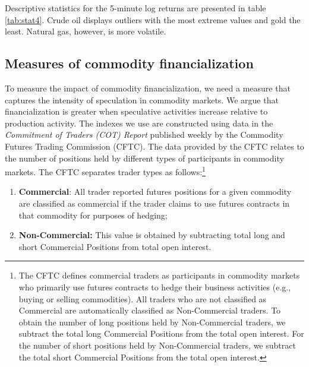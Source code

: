 \documentclass[12pt]{article}
\begin{document}
Descriptive statistics for the 5-minute log returns are presented in table \ref{tab:stat4}. Crude oil displays  outliers with the most extreme values and gold the least. Natural gas, however, is more volatile. %


\subsection{Measures of commodity financialization}
To measure the impact of commodity financialization, we need a measure that captures the intensity of speculation in commodity markets. We argue that financialization is greater when speculative activities increase relative to production activity. The indexes we use are constructed using data in the \emph{Commitment of Traders (COT) Report} published weekly by the Commodity Futures Trading Commission (CFTC).  The data provided by the CFTC relates to the number of positions held by different types of participants in commodity markets. The CFTC separates trader types as follows:\footnote{The CFTC defines commercial traders as participants in commodity markets who primarily use futures contracts to hedge their business activities (e.g., buying or selling commodities). All traders who are not classified as Commercial are automatically classified as Non-Commercial traders. To obtain the number of long positions held by Non-Commercial traders, we subtract the total long Commercial Positions from the total open interest. For the number of short positions held by Non-Commercial traders, we subtract the total short Commercial Positions from the total open interest.}


\begin{enumerate}
\item \textbf{Commercial}: All trader reported futures positions for a given commodity are classified as commercial if the trader claims to use futures contracts in that commodity for purposes of hedging;
\item \textbf{Non-Commercial:} This value is obtained by subtracting total long and short Commercial Positions from  total open interest.
\end{enumerate}
  
\end{document}
